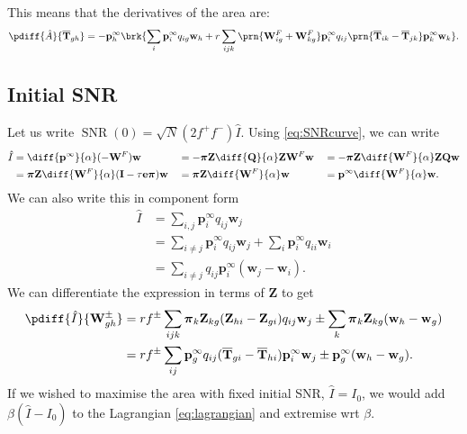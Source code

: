 \documentclass[12pt]{article}
\newcommand{\I}{\mathbf{I}}
\newcommand{\onev}{\mathbf{e}}
\newcommand{\MM}{\mathbf{Q}}
\newcommand{\eq}{\mathbf{p}^\infty}
\newcommand{\fpt}{\mathbf{T}}
\newcommand{\fptb}{\overline{\fpt}}
\newcommand{\fund}{\mathbf{Z}}
\newcommand{\pib}{\boldsymbol{\pi}}
\newcommand{\w}{\mathbf{w}}
\newcommand{\W}{\mathbf{W}}
\DeclareMathOperator{\SNR}{SNR}
\begin{document}
This means that the derivatives of the area are:
%
\begin{equation}\label{derivTarea}
  \pdiff{\hat{A}}{\fptb_{gh}} = -\eq_h\brk{
    \sum_i \eq_i q_{ig} \w_h
    + r\sum_{ijk} \prn{\W^F_{ig}+\W^F_{kg}} \eq_i q_{ij} \prn{\fptb_{ik}-\fptb_{jk}} \eq_k \w_k
    }.
\end{equation}
%



\subsection{Initial SNR}\label{sec:initSNR}

Let us write $\SNR(0) = \sqrt{N} (2f^+f^-) \hat{I}$. Using \eqref{eq:SNRcurve}, we can write
%
\begin{equation}\label{eq:initSNR}
  \begin{aligned}
    \hat{I} &= \diff{\eq}{\alpha}(-\W^F)\w &
      &= - \pib \fund \diff{\MM}{\alpha} \fund \W^F \w &
      &= - \pib \fund \diff{\W^F}{\alpha} \fund \MM \w \\
      &= \pib \fund \diff{\W^F}{\alpha} (\I - \tau\onev\pib) \w &
      &= \pib \fund \diff{\W^F}{\alpha} \w &
      &= \eq \diff{\W^F}{\alpha} \w .
  \end{aligned}
\end{equation}
%
We can also write this in component form
%
\begin{equation}\label{eq:initSNRcmpt}
  \begin{aligned}
     \hat{I} &= \sum_{i,j} \eq_i q_{ij} \w_j \\
      &= \sum_{i \neq j} \eq_i q_{ij} \w_j + \sum_i \eq_i q_{ii} \w_i \\
      &= \sum_{i \neq j} q_{ij} \eq_i (\w_j - \w_i).
  \end{aligned}
\end{equation}
%
We can differentiate the expression in terms of $\fund$ to get
%
\begin{equation}\label{eq:initSNRdiff}
 \begin{aligned}
  \pdiff{\hat{I}}{\W^\pm_{gh}}
    &= rf^\pm \sum_{ijk} \pib_k \fund_{kg} (\fund_{hi}-\fund_{gi}) q_{ij} \w_j
    \pm \sum_k \pib_k \fund_{kg} (\w_h - \w_g) \\
    &= rf^\pm \sum_{ij} \eq_g q_{ij} (\fptb_{gi}-\fptb_{hi}) \eq_i \w_j
    \pm \eq_g (\w_h - \w_g).
 \end{aligned}
\end{equation}
%
If we wished to maximise the area with fixed initial SNR, $\hat{I}=I_0$, we would add $\beta(\hat{I}-I_0)$ to the Lagrangian \eqref{eq:lagrangian} and extremise wrt $\beta$.
\end{document}
